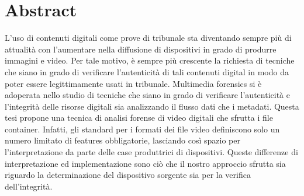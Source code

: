 \chapter*{Abstract}

L'uso di contenuti digitali come prove di tribunale sta diventando sempre più di attualità con l'aumentare nella diffusione di dispositivi in grado di produrre immagini e video. Per tale motivo, è sempre più crescente la richiesta di tecniche che siano in grado di verificare l'autenticità di tali contenuti digital in modo da poter essere legittimamente usati in tribunale.
Multimedia forensics si è adoperata nello studio di tecniche che siano in grado di verificare l'autenticità e l'integrità delle risorse digitali sia analizzando il flusso dati che i metadati. 
Questa tesi propone una tecnica di analisi forense di video digitali che sfrutta i file container. Infatti, gli standard per i formati dei file video definiscono solo un numero limitato di features obbligatorie, lasciando così spazio per l'interpretazione da parte delle case produttrici di dispositivi. Queste differenze di interpretazione ed implementazione sono ciò che il nostro approccio sfrutta sia riguardo la determinazione del dispositivo sorgente sia per la verifica dell'integrità.
